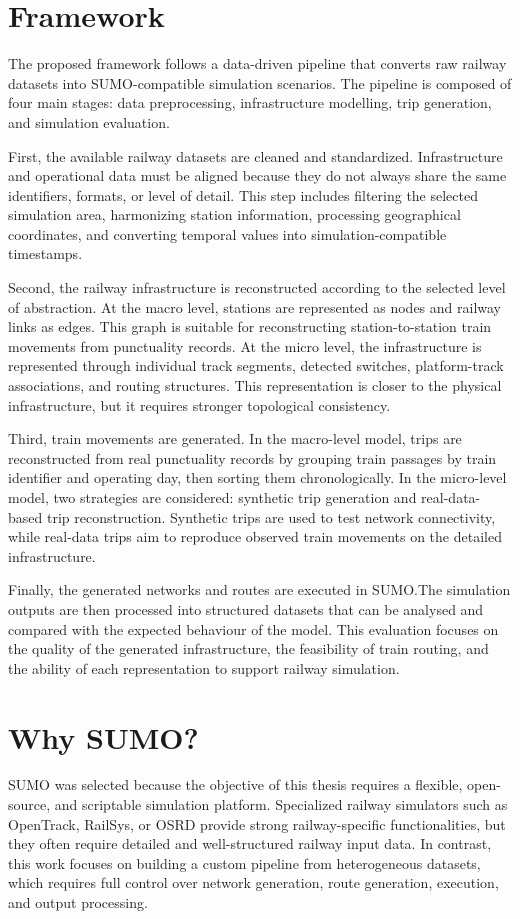 \section{Framework}
The proposed framework follows a data-driven pipeline that converts raw railway datasets into SUMO-compatible simulation 
scenarios. The pipeline is composed of four main stages: data preprocessing, infrastructure modelling, trip generation, 
and simulation evaluation.

First, the available railway datasets are cleaned and standardized. Infrastructure and operational data must be aligned 
because they do not always share the same identifiers, formats, or level of detail. This step includes filtering the 
selected simulation area, harmonizing station information, processing geographical coordinates, and converting temporal 
values into simulation-compatible timestamps.

Second, the railway infrastructure is reconstructed according to the selected level of abstraction. At the macro level, 
stations are represented as nodes and railway links as edges. This graph is suitable for reconstructing station-to-station 
train movements from punctuality records. At the micro level, the infrastructure is represented through individual track 
segments, detected switches, platform-track associations, and routing structures. This representation is closer to the 
physical infrastructure, but it requires stronger topological consistency.

Third, train movements are generated. In the macro-level model, trips are reconstructed from real punctuality records by 
grouping train passages by train identifier and operating day, then sorting them chronologically. In the micro-level model, 
two strategies are considered: synthetic trip generation and real-data-based trip reconstruction. Synthetic trips are used 
to test network connectivity, while real-data trips aim to reproduce observed train movements on the detailed 
infrastructure.

Finally, the generated networks and routes are executed in SUMO.\@ The simulation outputs are then processed into 
structured datasets that can be analysed and compared with the expected behaviour of the model. This evaluation focuses 
on the quality of the generated infrastructure, the feasibility of train routing, and the ability of each representation 
to support railway simulation.


\section{Why SUMO?}
SUMO was selected because the objective of this thesis requires a flexible, open-source, and scriptable simulation 
platform. Specialized railway simulators such as OpenTrack, RailSys, or OSRD provide strong railway-specific 
functionalities, but they often require detailed and well-structured railway input data. In contrast, this work focuses on 
building a custom pipeline from heterogeneous datasets, which requires full control over network generation, route 
generation, execution, and output processing.

